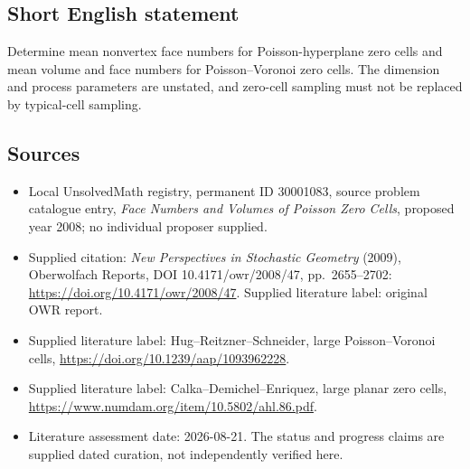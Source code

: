 \documentclass[11pt]{article}
\begin{document}
\subsection{Short English statement}
Determine mean nonvertex face numbers for Poisson-hyperplane zero cells and mean volume and face numbers for Poisson--Voronoi zero cells. The dimension and process parameters are unstated, and zero-cell sampling must not be replaced by typical-cell sampling.
\subsection{Sources}
\begin{itemize}\item Local UnsolvedMath registry, permanent ID 30001083, source problem catalogue entry, \emph{Face Numbers and Volumes of Poisson Zero Cells}, proposed year 2008; no individual proposer supplied.\item Supplied citation: \emph{New Perspectives in Stochastic Geometry} (2009), Oberwolfach Reports, DOI 10.4171/owr/2008/47, pp.\ 2655--2702: \url{https://doi.org/10.4171/owr/2008/47}. Supplied literature label: original OWR report.\item Supplied literature label: Hug--Reitzner--Schneider, large Poisson--Voronoi cells, \url{https://doi.org/10.1239/aap/1093962228}.\item Supplied literature label: Calka--Demichel--Enriquez, large planar zero cells, \url{https://www.numdam.org/item/10.5802/ahl.86.pdf}.\item Literature assessment date: 2026-08-21. The status and progress claims are supplied dated curation, not independently verified here.\end{itemize}
\end{document}

